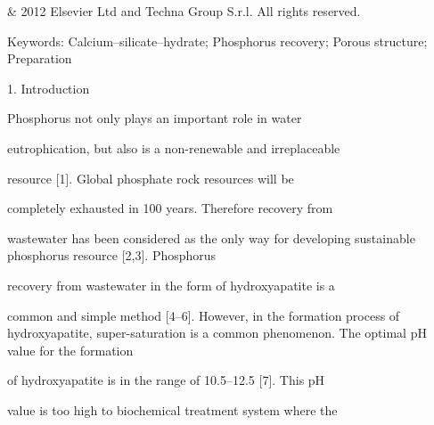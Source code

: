 \documentclass[a4paper,portrait,12pt]{article}
\begin{document}
\begin{flushleft}
\& 2012 Elsevier Ltd and Techna Group S.r.l. All rights reserved.
\end{flushleft}


\begin{flushleft}
Keywords: Calcium--silicate--hydrate; Phosphorus recovery; Porous structure; Preparation
\end{flushleft}





\begin{flushleft}
1. Introduction
\end{flushleft}


\begin{flushleft}
Phosphorus not only plays an important role in water
\end{flushleft}


\begin{flushleft}
eutrophication, but also is a non-renewable and irreplaceable
\end{flushleft}


\begin{flushleft}
resource [1]. Global phosphate rock resources will be
\end{flushleft}


\begin{flushleft}
completely exhausted in 100 years. Therefore recovery from
\end{flushleft}


\begin{flushleft}
wastewater has been considered as the only way for developing sustainable phosphorus resource [2,3]. Phosphorus
\end{flushleft}


\begin{flushleft}
recovery from wastewater in the form of hydroxyapatite is a
\end{flushleft}


\begin{flushleft}
common and simple method [4--6]. However, in the formation process of hydroxyapatite, super-saturation is a common phenomenon. The optimal pH value for the formation
\end{flushleft}


\begin{flushleft}
of hydroxyapatite is in the range of 10.5--12.5 [7]. This pH
\end{flushleft}


\begin{flushleft}
value is too high to biochemical treatment system where the
\end{flushleft}
\end{document}
